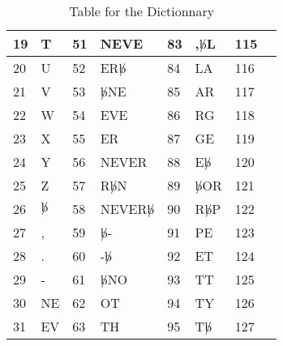 \begin{table}[htbp]
\begin{tabular}{||p{0.3 in}|p{0.6 in}||p{0.3 in}|p{0.6 in}||p{0.3 in}|p{0.6 in}||p{0.3 in}|p{0.6 in}||}
19 & T          & 51 & NEVE           & 83 & ,$\not b$L & 115 &   \\ \hline
20 & U          & 52 & ER$\not b$     & 84 & LA         & 116 &   \\ \hline
21 & V          & 53 & $\not b$NE     & 85 & AR         & 117 &   \\ \hline
22 & W          & 54 & EVE            & 86 & RG         & 118 &   \\ \hline
23 & X          & 55 & ER             & 87 & GE         & 119 &   \\ \hline
24 & Y          & 56 & NEVER          & 88 & E$\not b$  & 120 &   \\ \hline
25 & Z          & 57 & R$\not b$N     & 89 & $\not b$OR & 121 &   \\ \hline
26 & $\not b$   & 58 & NEVER$\not b$  & 90 & R$\not b$P & 122 &   \\ \hline
27 & ,          & 59 & $\not b$-      & 91 & PE         & 123 &   \\ \hline
28 & .          & 60 & -$\not b$      & 92 & ET         & 124 &   \\ \hline
29 & -          & 61 & $\not b$NO     & 93 & TT         & 125 &   \\ \hline
30 & NE         & 62 & OT             & 94 & TY         & 126 &   \\ \hline
31 & EV         & 63 & TH             & 95 & T$\not b$  & 127 &   \\ \hline
\end{tabular}
  \caption{Table for the Dictionnary}
  \label{tab:dico}
\end{table}

